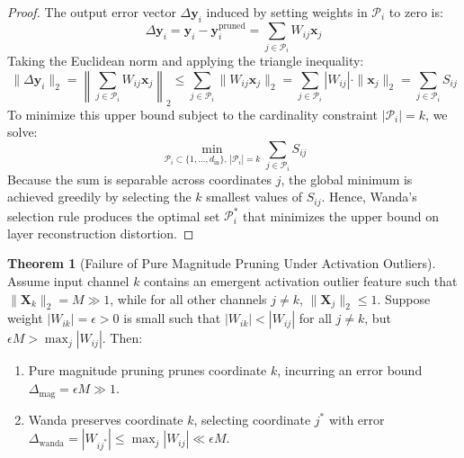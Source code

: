 \documentclass[11pt,a4paper]{article}
\theoremstyle{definition}
\newtheorem{theorem}{\textbf{Theorem}}[section]
\begin{document}
\begin{proof}
The output error vector $\Delta \mathbf{y}_i$ induced by setting weights in $\mathcal{P}_i$ to zero is:
\begin{equation}
\Delta \mathbf{y}_i = \mathbf{y}_i - \mathbf{y}_i^{\text{pruned}} = \sum_{j \in \mathcal{P}_i} W_{ij} \mathbf{x}_j
\end{equation}
Taking the Euclidean norm and applying the triangle inequality:
\begin{equation}
\|\Delta \mathbf{y}_i\|_2 = \left\| \sum_{j \in \mathcal{P}_i} W_{ij} \mathbf{x}_j \right\|_2 \le \sum_{j \in \mathcal{P}_i} \|W_{ij} \mathbf{x}_j\|_2 = \sum_{j \in \mathcal{P}_i} |W_{ij}| \cdot \|\mathbf{x}_j\|_2 = \sum_{j \in \mathcal{P}_i} S_{ij}
\end{equation}
To minimize this upper bound subject to the cardinality constraint $|\mathcal{P}_i| = k$, we solve:
\begin{equation}
\min_{\mathcal{P}_i \subset \{1, \dots, d_{\text{in}}\}, \, |\mathcal{P}_i|=k} \sum_{j \in \mathcal{P}_i} S_{ij}
\end{equation}
Because the sum is separable across coordinates $j$, the global minimum is achieved greedily by selecting the $k$ smallest values of $S_{ij}$.
Hence, Wanda's selection rule produces the optimal set $\mathcal{P}_i^*$ that minimizes the upper bound on layer reconstruction distortion.
\end{proof}

\begin{theorem}[Failure of Pure Magnitude Pruning Under Activation Outliers]
Assume input channel $k$ contains an emergent activation outlier feature such that $\|\mathbf{X}_k\|_2 = M \gg 1$, while for all other channels $j \neq k$, $\|\mathbf{X}_j\|_2 \le 1$. Suppose weight $|W_{ik}| = \epsilon > 0$ is small such that $|W_{ik}| < |W_{ij}|$ for all $j \neq k$, but $\epsilon M > \max_j |W_{ij}|$. Then:
\begin{enumerate}
    \item Pure magnitude pruning prunes coordinate $k$, incurring an error bound $\Delta_{\text{mag}} = \epsilon M \gg 1$.
    \item Wanda preserves coordinate $k$, selecting coordinate $j^*$ with error $\Delta_{\text{wanda}} = |W_{ij^*}| \le \max_j |W_{ij}| \ll \epsilon M$.
\end{enumerate}
\end{theorem}
\end{document}
